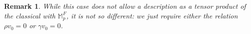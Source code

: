 \documentclass{amsart}
\newtheorem{proposition}[theorem]{Proposition}
\newtheorem{remark}[theorem]{Remark}
\theoremstyle{plain}
\numberwithin{theorem}{section}
\numberwithin{equation}{section}
\numberwithin{figure}{section}
\DeclareMathOperator{\Ext}{Ext}
\newcommand{\mF}{{\mathbb F}}
\newcommand{\mM}{{\mathbb M}}
\newcommand{\cE}{{\mathcal E}}
\newcommand{\0}{\langle 0 \rangle }
\begin{document}
\begin{remark}
    \rm
    While this case does not allow a description as a tensor product of the classical with $\mM_{p}^{F}$, it is not so different: we just require either the relation $\rho v_0 = 0$ or $\gamma v_0 = 0$.
\end{remark}
\end{document}
